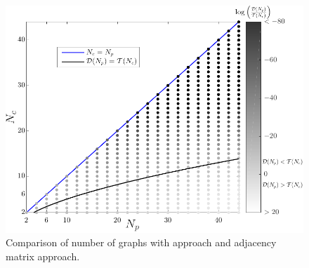 \begin{figure}
\centering
\includegraphics[width=0.6\columnwidth]{../ch2/figures/power2comparison}
\caption[Comparison between a \mypm{} approach and adjacency matrix approach.]{Comparison of number of graphs with \mypm{} approach and adjacency matrix approach.\label{fig:ch2:power2comparison}}
\end{figure}